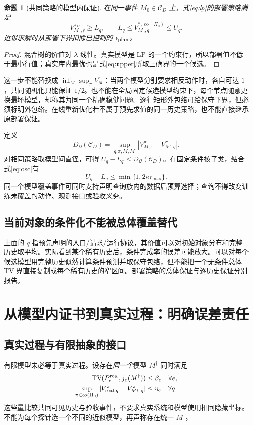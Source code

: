 \documentclass[11pt,a4paper,fontset=fandol]{ctexart}
\newtheorem{proposition}[theorem]{命题}
\theoremstyle{definition}\newtheorem{definition}[theorem]{定义}
\theoremstyle{remark}\newtheorem{remark}[theorem]{说明}
\numberwithin{equation}{section}
\newcommand{\TV}{\operatorname{TV}}\newcommand{\osc}{\operatorname{osc}}
\newcommand{\cC}{\mathcal C}\newcommand{\cQ}{\mathcal Q}
\begin{document}
\begin{proposition}[共同策略的模型内保证]
\label{prop:common}
在同一事件 $M_0\in\cC_D$ 上，式\eqref{eq:lp}的部署策略满足
\begin{equation}
 V_{M_0,q}^{\pi_D}\ge L_q,\qquad
 L_q\le V_{M_0,q}^{*,\operatorname{co}(\Pi_0)}\le U_q.
 \label{eq:common}
\end{equation}
近似求解时从部署下界扣除已控制的 $\epsilon_{\rm plan}$。
\end{proposition}
\begin{proof}
混合树的价值对 $\lambda$ 线性。真实模型是 LP 的一个约束行，所以部署值不低于最小行值；真实库内最优也是式\eqref{eq:upper}所取上确界的一个候选。
\end{proof}

这一步不能替换成 $\inf_M\sup_\pi V_M^\pi$：当两个模型分别要求相反动作时，各自可达 $1$，共同随机化只能保证 $1/2$。也不能在全局固定候选模型约束下，每个节点随意更换最坏模型，却称其为同一个精确稳健问题。逐行矩形外包络可给保守下界，但必须标明外包络。在线重新优化若不属于预先求值的同一历史策略，也不能直接继承原部署保证。

定义
\begin{equation}
 D_{\cQ}(\cC_D)=\sup_{q,\pi,M,M'}
 |V_{M,q}^{\pi}-V_{M',q}^{\pi}|.
\end{equation}
对相同策略取模型间直径，可得 $U_q-L_q\le D_{\cQ}(\cC_D)$。在固定条件核子类，结合式\eqref{eq:osc}有
\begin{equation}
 U_q-L_q\le\min\{1,2\kappa r_{\max}\}.
 \label{eq:width}
\end{equation}
同一个模型覆盖事件可同时支持声明查询族内的数据后预算选择；查询不得改变训练未覆盖的动作、观测接口或验收义务。

\subsection{当前对象的条件化不能被总体覆盖替代}
上面的 $q$ 指预先声明的入口/请求/运行协议，其价值可以对初始对象分布和完整历史取平均。实际看到某个稀有历史后，条件完成率的误差可能放大。可以对每个候选模型用完整历史似然计算条件预测并取保守包络，但不能把一个无条件总体 TV 界直接复制成每个稀有历史的窄区间。部署策略的总体保证与逐历史保证分别报告。

\section{从模型内证书到真实过程：明确误差责任}
\label{sec:validity}
\subsection{真实过程与有限抽象的接口}
有限模型未必等于真实过程。设存在\emph{同一个}模型 $M^\dagger$ 同时满足
\begin{align}
 \TV(P_e^{\rm real},j_e(M^\dagger))&\le\beta_e\quad\forall e,\\
 \sup_{\pi\in\operatorname{co}(\Pi_0)}
 |V_{{\rm real},q}^{\pi}-V_{M^\dagger,q}^{\pi}|&\le\eta_q\quad\forall q.
 \label{eq:abstraction}
\end{align}
这些量比较共同可见历史与验收事件，不要求真实系统和模型使用相同隐藏坐标。不能为每个探针选一个不同的近似模型，再声称存在统一 $M^\dagger$。
\end{document}
